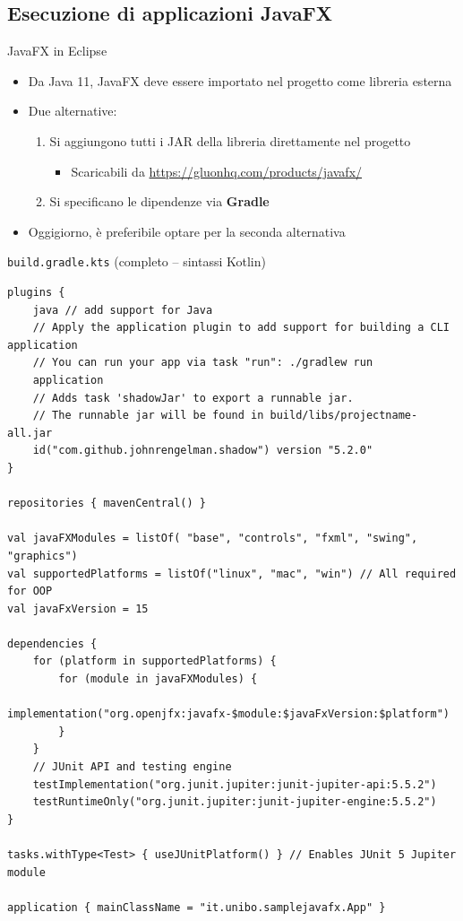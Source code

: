 \documentclass[xcolor=dvipsnames,presentation]{beamer}
\begin{document}
\subsection{Esecuzione di applicazioni JavaFX}

\begin{frame}{JavaFX in Eclipse}
\begin{itemize}\itemsep10pt
\item Da Java 11, JavaFX deve essere importato nel progetto come libreria esterna
\item Due alternative:
\begin{enumerate}
\item Si aggiungono tutti i JAR della libreria direttamente nel progetto
\begin{itemize}
\item Scaricabili da \url{https://gluonhq.com/products/javafx/}
\end{itemize}
\item Si specificano le dipendenze via \textbf{Gradle}
\end{enumerate}
\item Oggigiorno, è preferibile optare per la seconda alternativa
\end{itemize}
\end{frame}



\begin{frame}[fragile]{\texttt{build.gradle.kts} (completo -- sintassi Kotlin)}
\begin{lstlisting}[basicstyle=\tiny]
plugins {
    java // add support for Java
    // Apply the application plugin to add support for building a CLI application
    // You can run your app via task "run": ./gradlew run
    application
    // Adds task 'shadowJar' to export a runnable jar.
    // The runnable jar will be found in build/libs/projectname-all.jar
    id("com.github.johnrengelman.shadow") version "5.2.0"
}

repositories { mavenCentral() }

val javaFXModules = listOf( "base", "controls", "fxml", "swing", "graphics")
val supportedPlatforms = listOf("linux", "mac", "win") // All required for OOP
val javaFxVersion = 15

dependencies {
    for (platform in supportedPlatforms) {
        for (module in javaFXModules) {
            implementation("org.openjfx:javafx-$module:$javaFxVersion:$platform")
        }
    }
    // JUnit API and testing engine
    testImplementation("org.junit.jupiter:junit-jupiter-api:5.5.2")
    testRuntimeOnly("org.junit.jupiter:junit-jupiter-engine:5.5.2")
}

tasks.withType<Test> { useJUnitPlatform() } // Enables JUnit 5 Jupiter module 

application { mainClassName = "it.unibo.samplejavafx.App" }
\end{lstlisting}
\end{frame}
\end{document}
